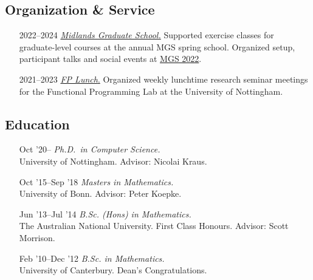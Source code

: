 \documentclass[12pt,a4paper]{article}
\begin{document}
\subsection{Organization \& Service}

\begin{itemize}[leftmargin=7ex]
\item[\small 2022--2024]
  \href{http://www.cs.nott.ac.uk/MGS}{\emph{Midlands Graduate School.}}
  Supported exercise classes for graduate-level courses at the annual MGS spring school.
  Organized setup, participant talks and social events at \href{https://www.cs.nott.ac.uk/~psznk/events/mgs22.html}{MGS 2022}.
\item[\small 2021--2023]
  \href{https://www.nottingham.ac.uk/research/groups/fp-lab/fp-lunch/fp-lunch.aspx}{\emph{FP Lunch}.}
  Organized weekly lunchtime research seminar meetings for the Functional Programming Lab at the University of Nottingham.
\end{itemize}

\subsection{Education}

\begin{itemize}[leftmargin=7ex]
\item[\small {\scriptsize Oct} '20--]
  \emph{Ph.D.~in Computer Science.}\\
  University of Nottingham.
  Advisor: Nicolai Kraus.

\item[\small {\scriptsize Oct} '15--{\scriptsize Sep} '18]
  \emph{Masters in Mathematics.}\\
  University of Bonn.
  Advisor: Peter Koepke.

\item[\small {\scriptsize Jun} '13--{\scriptsize Jul} '14]
  \emph{B.Sc. (Hons) in Mathematics.}\\
  The Australian National University.
  First Class Honours.
  Advisor: Scott Morrison.

\item[\small {\scriptsize Feb} '10--{\scriptsize Dec} '12]
  \emph{B.Sc. in Mathematics.}\\
  University of Canterbury.
  Dean's Congratulations.
\end{itemize}
\end{document}
